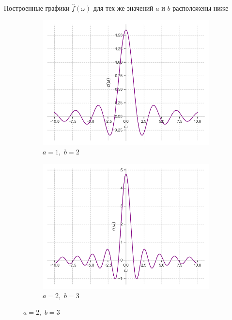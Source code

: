 \documentclass[a4paper, 16pt]{article}
\begin{document}
    \noindent Построенные графики $\hat{f}\left(\omega\right)$ для тех же значений $a$ и $b$ расположены ниже
    \begin{figure}[htbp]
        \centering
        \begin{subfigure}{0.3\textwidth}
            \centering
            \includegraphics[width=\linewidth]{rectfimg_a=1_b=2.png}
            \caption{$a=1,\,\,b=2$}
            \label{fig:rectfimg_1}
        \end{subfigure}
        \hfill
        \begin{subfigure}{0.3\textwidth}
            \centering
            \includegraphics[width=\linewidth]{rectfimg_a=2_b=3.png}
            \caption{$a=2,\,\,b=3$}
            \label{fig:rectfimg_2}

\end{subfigure}
\end{figure}
\end{document}

